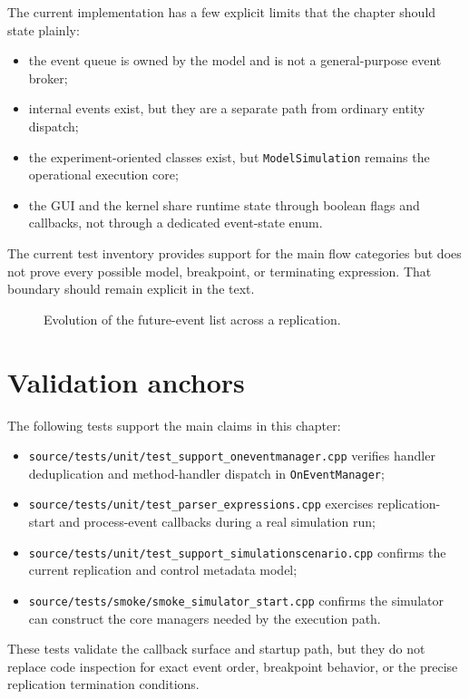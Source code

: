 The current implementation has a few explicit limits that the chapter should
state plainly:
\begin{itemize}
\item the event queue is owned by the model and is not a general-purpose event
broker;
\item internal events exist, but they are a separate path from ordinary entity
dispatch;
\item the experiment-oriented classes exist, but \texttt{ModelSimulation}
remains the operational execution core;
\item the GUI and the kernel share runtime state through boolean flags and
callbacks, not through a dedicated event-state enum.
\end{itemize}

The current test inventory provides support for the main flow categories but
does not prove every possible model, breakpoint, or terminating expression.
That boundary should remain explicit in the text.

\begin{figure}[htbp]
\centering
\caption{Evolution of the future-event list across a replication.}
\label{fig:event-scheduling-list-evolution}
\end{figure}

\section{Validation anchors}
\label{sec:event-scheduling-validation-anchors}

The following tests support the main claims in this chapter:
\begin{itemize}
\item \texttt{source/tests/unit/test\_support\_oneventmanager.cpp} verifies
handler deduplication and method-handler dispatch in \texttt{OnEventManager};
\item \texttt{source/tests/unit/test\_parser\_expressions.cpp} exercises
replication-start and process-event callbacks during a real simulation run;
\item \texttt{source/tests/unit/test\_support\_simulationscenario.cpp} confirms
the current replication and control metadata model;
\item \texttt{source/tests/smoke/smoke\_simulator\_start.cpp} confirms the
simulator can construct the core managers needed by the execution path.
\end{itemize}

These tests validate the callback surface and startup path, but they do not
replace code inspection for exact event order, breakpoint behavior, or the
precise replication termination conditions.
